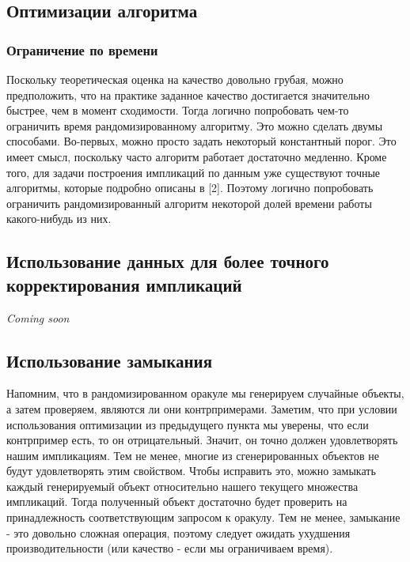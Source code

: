 \subsection{Оптимизации алгоритма}
\subsubsection{Ограничение по времени}
Поскольку теоретическая оценка на качество довольно грубая, можно предположить, что на практике заданное качество достигается значительно быстрее, чем в момент сходимости. Тогда логично попробовать чем-то ограничить время рандомизированному алгоритму. Это можно сделать двумы способами. Во-первых, можно просто задать некоторый константный порог. Это имеет смысл, поскольку часто алгоритм работает достаточно медленно. Кроме того, для задачи построения импликаций по данным уже существуют точные алгоритмы, которые подробно описаны в [2]. Поэтому логично попробовать ограничить рандомизированный алгоритм некоторой долей времени работы какого-нибудь из них.

\subsection{Использование данных для более точного корректирования импликаций}
\emph{Coming soon}

\subsection{Использование замыкания}
Напомним, что в рандомизированном оракуле мы генерируем случайные объекты, а затем проверяем, являются ли они контрпримерами. Заметим, что при условии использования оптимизации из предыдущего пункта мы уверены, что если контрпример есть, то он отрицательный. Значит, он точно должен удовлетворять нашим импликациям. Тем не менее, многие из сгенерированных объектов не будут удовлетворять этим свойством. Чтобы исправить это, можно замыкать каждый генерируемый объект относительно нашего текущего множества импликаций. Тогда полученный объект достаточно будет проверить на принадлежность соответствующим запросом к оракулу. Тем не менее, замыкание - это довольно сложная операция, поэтому следует ожидать ухудшения производительности (или качество - если мы ограничиваем время).